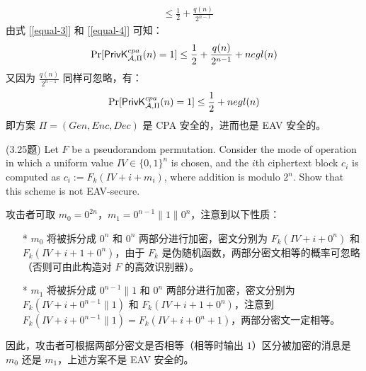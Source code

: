 \begin{questions}
\begin{solution}
\begin{enumerate}
\begin{equation}
\begin{aligned}
                       &\leq\frac{1}{2}+\frac{q(n)}{2^{n-1}}
                    \end{aligned}
                \end{equation}
                由式 [\ref{equal-3}] 和 [\ref{equal-4}] 可知：
                \begin{equation}
                    \begin{aligned}
                       \Pr[\mathsf{PrivK}^{cpa}_{\mathcal{A},\Pi}(n)=1]\leq\frac{1}{2}+\frac{q(n)}{2^{n-1}}+negl(n)
                    \end{aligned}
                \end{equation}
                又因为 $\frac{q(n)}{2^{n-1}}$ 同样可忽略，有：
                \begin{equation}
                    \begin{aligned}
                       \Pr[\mathsf{PrivK}^{cpa}_{\mathcal{A},\Pi}(n)=1]\leq\frac{1}{2}+negl(n)
                    \end{aligned}
                \end{equation}
                即方案 $\Pi=(Gen,Enc,Dec)$ 是 CPA 安全的，进而也是 EAV 安全的。
            \end{enumerate}
        \end{solution}

    \question (3.25题) Let $F$ be a pseudorandom permutation. Consider the mode of operation in which a uniform value $IV\in\{0,1\}^n$ is chosen, and the $i$th ciphertext block $c_i$ is computed as $c_i:=F_k(IV+i+m_i)$, where addition is modulo $2^n$. Show that this scheme is not EAV-secure.

        \begin{solution}
            \newline
            攻击者可取 $m_0=0^{2n}$，$m_1=0^{n-1}\parallel1\parallel0^n$，注意到以下性质：
            \begin{enumerate}
                \item[*] $m_0$ 将被拆分成 $0^n$ 和 $0^n$ 两部分进行加密，密文分别为 $F_k(IV+i+0^n)$ 和 $F_k(IV+i+1+0^n)$，由于 $F_k$ 是伪随机函数，两部分密文相等的概率可忽略（否则可由此构造对 $F$ 的高效识别器）。
                \item[*] $m_1$ 将被拆分成 $0^{n-1}\parallel1$ 和 $0^n$ 两部分进行加密，密文分别为 $F_k(IV+i+0^{n-1}\parallel1)$ 和 $F_k(IV+i+1+0^n)$，注意到$F_k(IV+i+0^{n-1}\parallel1)=F_k(IV+i+0^n+1)$，两部分密文一定相等。
            \end{enumerate}
            因此，攻击者可根据两部分密文是否相等（相等时输出 $1$）区分被加密的消息是 $m_0$ 还是 $m_1$，上述方案不是 EAV 安全的。
        \end{solution}


\end{questions}

